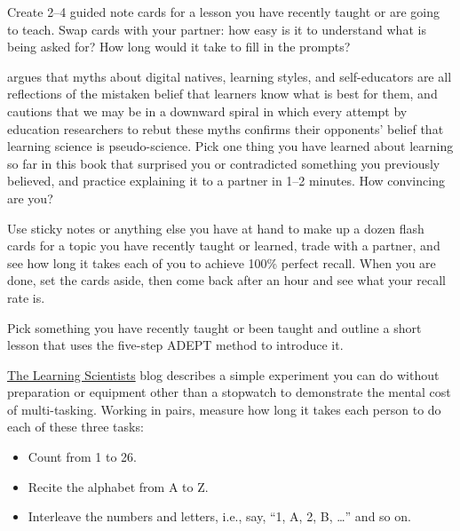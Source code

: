 Create 2--4 guided note cards for a lesson you have recently taught or
are going to teach.  Swap cards with your partner: how easy is it to
understand what is being asked for?  How long would it take to fill in
the prompts?


\cite{Kirs2013} argues that myths about digital natives, learning
styles, and self-educators are all reflections of the mistaken belief
that learners know what is best for them, and cautions that we may be
in a downward spiral in which every attempt by education researchers
to rebut these myths confirms their opponents' belief that learning
science is pseudo-science.  Pick one thing you have learned about
learning so far in this book that surprised you or contradicted
something you previously believed, and practice explaining it to a
partner in 1--2 minutes.  How convincing are you?


Use sticky notes or anything else you have at hand to make up a dozen
flash cards for a topic you have recently taught or learned, trade
with a partner, and see how long it takes each of you to achieve 100\%
perfect recall.  When you are done, set the cards aside, then come
back after an hour and see what your recall rate is.


Pick something you have recently taught or been taught and outline a
short lesson that uses the five-step ADEPT method to introduce it.


\href{http://www.learningscientists.org/blog/2017/7/28-1}{The Learning
  Scientists} blog describes a simple experiment you can do without
preparation or equipment other than a stopwatch to demonstrate the
mental cost of multi-tasking.  Working in pairs, measure how long it
takes each person to do each of these three tasks:

\begin{itemize}

\item
  Count from 1 to 26.

\item
  Recite the alphabet from A to Z.

\item
  Interleave the numbers and letters, i.e., say, ``1, A, 2, B,
  {\ldots}'' and so on.

\end{itemize}

